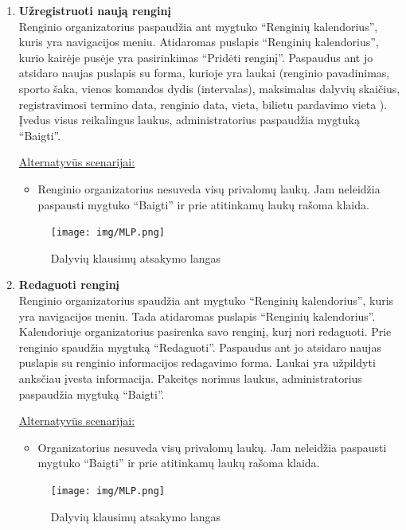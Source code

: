 \documentclass{VUMIFPSkursinis}
\begin{document}
\begin{enumerate} [label = \textbf{U\arabic*.}]
			\item \textbf{Užregistruoti naują renginį}   \\
					Renginio organizatorius paspaudžia ant mygtuko “Renginių kalendorius”, kuris yra navigacijos meniu. Atidaromas puslapis “Renginių kalendorius”, kurio kairėje pusėje yra pasirinkimas “Pridėti renginį”. Paspaudus ant jo atsidaro naujas puslapis su forma, kurioje yra laukai (renginio pavadinimas, sporto šaka, vienos komandos dydis (intervalas), maksimalus dalyvių skaičius, registravimosi termino data, renginio data, vieta, bilietu pardavimo vieta ). Įvedus visus reikalingus laukus, administratorius paspaudžia mygtuką “Baigti”.
					
					\underline{Alternatyvūs scenarijai:}
					\begin{itemize}
						\item Renginio organizatorius nesuveda visų privalomų laukų. Jam neleidžia paspausti mygtuko “Baigti” ir prie atitinkamų laukų rašoma klaida.
					\end{itemize}
				
				\begin{figure}[H]
					\centering
					\texttt{[image: img/MLP.png]}
					\caption{Dalyvių klausimų atsakymo langas}
					\label{fig:atsakyti-klausimus}
				\end{figure}	
			
			\item \textbf{Redaguoti renginį}   \\
					Renginio organizatorius spaudžia ant mygtuko “Renginių kalendorius”, kuris yra navigacijos meniu. Tada atidaromas puslapis “Renginių kalendorius”. Kalendoriuje organizatorius pasirenka savo renginį, kurį nori redaguoti. Prie renginio spaudžia mygtuką “Redaguoti”. Paspaudus ant jo atsidaro naujas puslapis su renginio informacijos redagavimo forma. Laukai yra užpildyti anksčiau įvesta informacija. Pakeitęs norimus laukus, administratorius paspaudžia mygtuką “Baigti”.
					
					\underline{Alternatyvūs scenarijai:}
					\begin{itemize}
						\item Organizatorius nesuveda visų privalomų laukų. Jam neleidžia paspausti mygtuko “Baigti” ir prie atitinkamų laukų rašoma klaida.
					\end{itemize}
				
				\begin{figure}[H]
					\centering
					\texttt{[image: img/MLP.png]}
					\caption{Dalyvių klausimų atsakymo langas}
					\label{fig:atsakyti-klausimus}
				\end{figure}
			

\end{enumerate}
\end{document}
